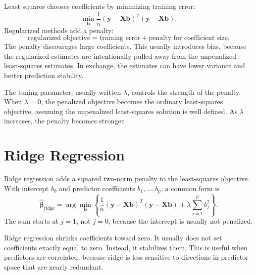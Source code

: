 Least squares chooses coefficients by minimizing training error:
\begin{equation}
  \min_{\mathbf{b}}\frac{1}{n}(\mathbf{y}-\mathbf{X}\mathbf{b})^T(\mathbf{y}-\mathbf{X}\mathbf{b}).
\end{equation}
Regularized methods add a penalty:
\begin{equation}
  \boxed{
  \text{regularized objective}
  =\text{training error}+\text{penalty for coefficient size}.
  }
\end{equation}
The penalty discourages large coefficients.  This usually introduces bias, because the regularized estimates are intentionally pulled away from the unpenalized least-squares estimates.  In exchange, the estimates can have lower variance and better prediction stability.

The tuning parameter, usually written \(\lambda\), controls the strength of the penalty.  When \(\lambda=0\), the penalized objective becomes the ordinary least-squares objective, assuming the unpenalized least-squares solution is well defined.  As \(\lambda\) increases, the penalty becomes stronger.

\section{Ridge Regression}

Ridge regression adds a squared two-norm penalty to the least-squares objective.  With intercept \(b_0\) and predictor coefficients \(b_1,\ldots,b_p\), a common form is
\begin{equation}
  \boxed{
  \widehat{\boldsymbol{\beta}}_{\mathrm{ridge}}
  =\arg\min_{\mathbf{b}}
  \left\{
  \frac{1}{n}(\mathbf{y}-\mathbf{X}\mathbf{b})^T(\mathbf{y}-\mathbf{X}\mathbf{b})
  +\lambda\sum_{j=1}^{p} b_j^2
  \right\}.
  }
  \label{eq:ch16-ridge-objective}
\end{equation}
The sum starts at \(j=1\), not \(j=0\), because the intercept is usually not penalized.

Ridge regression shrinks coefficients toward zero.  It usually does not set coefficients exactly equal to zero.  Instead, it stabilizes them.  This is useful when predictors are correlated, because ridge is less sensitive to directions in predictor space that are nearly redundant.


